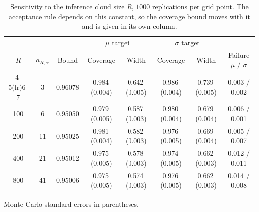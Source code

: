 \begin{table}[!htbp]
\centering
\caption{Sensitivity to the inference cloud size $R$, $1000$ replications per grid point. The acceptance rule depends on this constant, so the coverage bound moves with it and is given in its own column.}
\label{tab:sens-R_synthetic}
\small
\begin{tabular}{cccccccc}
\toprule
& & & \multicolumn{2}{c}{$\mu$ target} & \multicolumn{2}{c}{$\sigma$ target} & \\
$R$ & $a_{R,\alpha}$ & Bound & Coverage & Width & Coverage & Width & Failure $\mu$ / $\sigma$ \\
\cmidrule(lr){4-5}\cmidrule(lr){6-7}
\midrule
50 & 3 & 0.96078 & 0.984\,(0.004) & 0.642\,(0.005) & 0.986\,(0.004) & 0.739\,(0.005) & 0.003 / 0.002 \\
100 & 6 & 0.95050 & 0.979\,(0.005) & 0.587\,(0.003) & 0.980\,(0.004) & 0.679\,(0.004) & 0.006 / 0.001 \\
200 & 11 & 0.95025 & 0.981\,(0.004) & 0.582\,(0.003) & 0.976\,(0.005) & 0.669\,(0.004) & 0.005 / 0.007 \\
400 & 21 & 0.95012 & 0.975\,(0.005) & 0.578\,(0.003) & 0.974\,(0.005) & 0.662\,(0.003) & 0.012 / 0.011 \\
800 & 41 & 0.95006 & 0.975\,(0.005) & 0.574\,(0.003) & 0.976\,(0.005) & 0.662\,(0.003) & 0.014 / 0.008 \\
\bottomrule
\end{tabular}

\vspace{2pt}
\begin{minipage}{.94\linewidth}\footnotesize
Monte Carlo standard errors in parentheses.
\end{minipage}
\end{table}
